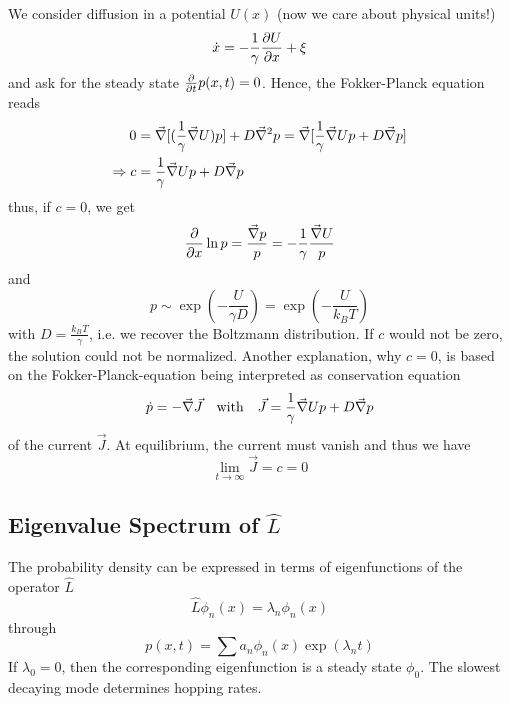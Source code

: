 \documentclass{notebook}
\begin{document}
We consider diffusion in a potential $U(x)$ (now we care about physical units!)
%
\begin{equation}
\dot{x} = - \frac{1}{\gamma} \pdv{U}{x} + \xi
\end{equation}
%
and ask for the steady state $\pdv{t} p(x,t) = 0$. Hence, the Fokker-Planck equation reads
%
\begin{align*}
	0 &= \vec{\nabla} [(\frac{1}{\gamma} \vec{\nabla} U) p] + D \vec{\nabla}^2 p 
	= \vec{\nabla} [\frac{1}{\gamma} \vec{\nabla} U p + D \vec{\nabla} p] \\
	\Rightarrow c &= \frac{1}{\gamma} \vec{\nabla} U p + D \vec{\nabla} p
\end{align*}
%
thus, if $c = 0$, we get
%
\begin{equation}
\pdv{x} \ln p = \frac{\vec{\nabla} p}{p} = - \frac{1}{\gamma} \frac{\vec{\nabla} U}{p}
\end{equation}
%
and 
%
\begin{equation}
p \sim \exp(-\frac{U}{\gamma D}) = \exp(-\frac{U}{k_B T})
\end{equation}
%
with $D = \frac{k_B T}{\gamma}$, i.e. we recover the Boltzmann distribution. If $c$ would not be zero, the solution could not be normalized. Another explanation, why $c = 0$, is based on the Fokker-Planck-equation being interpreted as conservation equation 
%
\begin{equation}
\dot{p} = - \vec{\nabla} \vec{J} \quad \mathrm{with} \quad \vec{J} = \frac{1}{\gamma} \vec{\nabla} U p + D \vec{\nabla} p
\end{equation}
%
of the current $\vec{J}$. At equilibrium, the current must vanish and thus we have
%
\begin{equation}
\lim_{t \to \infty} \vec{J} = c = 0
\end{equation}
%

\subsection*{Eigenvalue Spectrum of $\hat{L}$}

The probability density can be expressed in terms of eigenfunctions of the operator $\hat{L}$
%
\begin{equation}
\hat{L} \phi_n(x) = \lambda_n \phi_n(x)
\end{equation}
%
through
%
\begin{equation}
p(x,t) = \sum a_n \phi_n(x) \exp(\lambda_n t)
\end{equation}
%
If $\lambda_0 = 0$, then the corresponding eigenfunction is a steady state $\phi_0$. The slowest decaying mode determines hopping rates.
\end{document}
